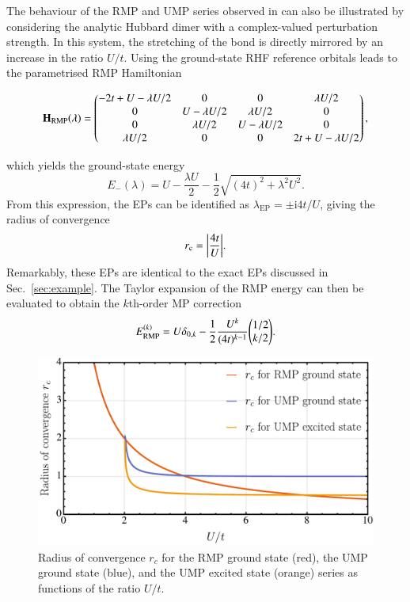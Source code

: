 \documentclass[aps,prb,reprint,noshowkeys,superscriptaddress]{revtex4-1}
\newcommand{\bH}{\mathbf{H}}
\renewcommand{\i}{\mathrm{i}} %
\newcommand{\rc}{r_{\text{c}}}
\newcommand{\lep}{\lambda_{\text{EP}}}
\begin{document}
The behaviour of the RMP and UMP series observed in  can also be illustrated by considering
the analytic Hubbard dimer with a complex-valued perturbation strength.
In this system, the stretching of the  bond is directly mirrored by an increase in the ratio $U/t$.
Using the ground-state RHF reference orbitals leads to the parametrised RMP Hamiltonian
\begin{widetext}
\begin{equation}
\label{eq:H_RMP}
\bH_\text{RMP}\qty(\lambda) = 
	\begin{pmatrix}
		-2t + U - \lambda U/2	&	0					&	0					&	\lambda U/2	\\
		0						&	U - \lambda U/2 	&	\lambda U/2			&	0	\\
		0						&	\lambda U/2			&	U - \lambda U/2 	&	0	\\
		\lambda U/2 			&	0 					&	0					&	2t + U - \lambda U/2	\\
	\end{pmatrix},
\end{equation}
\end{widetext}
which yields the ground-state energy 
\begin{equation}
	\label{eq:E0MP}
	E_{-}(\lambda) = U - \frac{\lambda U}{2} - \frac{1}{2} \sqrt{(4t)^2 + \lambda ^2 U^2}.
\end{equation}
From this expression, the EPs can be identified as $\lep = \pm \i 4t / U$,
giving the radius of convergence
\begin{equation}
    \rc = \abs{\frac{4t}{U}}.
\end{equation}
Remarkably, these EPs are identical to the exact EPs discussed in Sec.~\ref{sec:example}.
The Taylor expansion of the RMP energy can then be evaluated to obtain the $k$th-order MP correction
\begin{equation}
	E_\text{RMP}^{(k)} = U \delta_{0,k} - \frac{1}{2} \frac{U^k}{(4t)^{k-1}} \mqty( 1/2 \\ k/2).
\end{equation}
 
\begin{figure}[htb]
	\includegraphics[width=\linewidth]{fig5}
	\caption{
	Radius of convergence $r_c$ for the RMP ground state (red), the UMP ground state (blue), and the UMP excited state (orange) 
    series as functions of the ratio $U/t$.
	\label{fig:RadConv}}
\end{figure}
\end{document}
